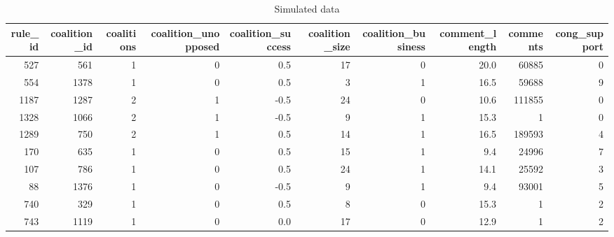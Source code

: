\documentclass[
      12pt,
        ]{article}
\begin{document}
\begin{table}[t]

\caption{\label{tab:unnamed-chunk-1}Simulated data}
\centering
\fontsize{5}{7}\selectfont
\begin{tabular}{r|r|r|r|r|r|r|r|r|r}
\hline
rule\_id & coalition\_id & coalitions & coalition\_unopposed & coalition\_success & coalition\_size & coalition\_business & comment\_length & comments & cong\_support\\
\hline
527 & 561 & 1 & 0 & 0.5 & 17 & 0 & 20.0 & 60885 & 0\\
\hline
554 & 1378 & 1 & 0 & 0.5 & 3 & 1 & 16.5 & 59688 & 9\\
\hline
1187 & 1287 & 2 & 1 & -0.5 & 24 & 0 & 10.6 & 111855 & 0\\
\hline
1328 & 1066 & 2 & 1 & -0.5 & 9 & 1 & 15.3 & 1 & 0\\
\hline
1289 & 750 & 2 & 1 & 0.5 & 14 & 1 & 16.5 & 189593 & 4\\
\hline
170 & 635 & 1 & 0 & 0.5 & 15 & 1 & 9.4 & 24996 & 7\\
\hline
107 & 786 & 1 & 0 & 0.5 & 24 & 1 & 14.1 & 25592 & 3\\
\hline
88 & 1376 & 1 & 0 & -0.5 & 9 & 1 & 9.4 & 93001 & 5\\
\hline
740 & 329 & 1 & 0 & 0.5 & 8 & 0 & 15.3 & 1 & 2\\
\hline
743 & 1119 & 1 & 0 & 0.0 & 17 & 0 & 12.9 & 1 & 2\\
\hline
\end{tabular}
\end{table}
\end{document}
